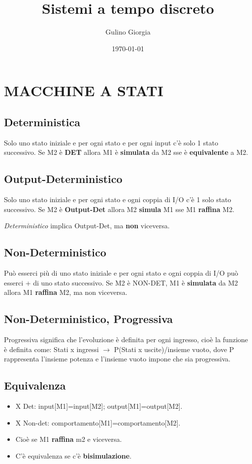 \documentclass[a4paper]{article}
\title{Sistemi a tempo discreto}
\author{Gulino Giorgia}
\date{\today}
\begin{document}
\maketitle
\newpage
\tableofcontents
\newpage

\section{MACCHINE A STATI}


\subsection{Deterministica}Solo uno stato iniziale e per ogni stato e per ogni input c'è solo 1 stato successivo. Se M2 è \textbf{DET} allora M1 è \textbf{simulata} da M2 sse è \textbf{equivalente} a M2.
\subsection{Output-Deterministico}Solo uno stato iniziale e per ogni stato e ogni coppia di I/O c'è 1 solo stato successivo. Se M2 è \textbf{Output-Det} allora M2 \textbf{simula} M1 sse M1 \textbf{raffina} M2.\\
\begin{center}
\emph{Deterministico} implica Output-Det, ma \textbf{non} viceversa.
\end{center}
\subsection{Non-Deterministico}Può esserci più di uno stato iniziale e per ogni stato e ogni coppia di I/O può esserci + di uno stato successivo. Se M2 è NON-DET, M1 è \textbf{simulata} da M2 allora M1 \textbf{raffina} M2, ma non viceversa.
\subsection{Non-Deterministico, Progressiva}Progressiva significa che l'evoluzione è definita per ogni ingresso, cioè la funzione è definita come: Stati x ingressi $\rightarrow$ P(Stati x uscite)/insieme vuoto, dove P rappresenta l'insieme potenza e l'insieme vuoto impone che sia progressiva.
\subsection{Equivalenza}
\begin{itemize}
\item X Det: input[M1]=input[M2]; output[M1]=output[M2].
\item X Non-det: comportamento[M1]=comportamento[M2].
\item Cioè se M1 \textbf{raffina} m2 e viceversa.
\item C'è equivalenza se c'è \textbf{bisimulazione}.
\end{itemize}
\end{document}
